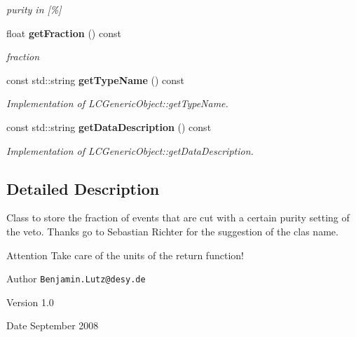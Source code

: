 \begin{DoxyCompactItemize}
\begin{DoxyCompactList}\small\item\em purity in [\%] \item\end{DoxyCompactList}\item 
float {\bf getFraction} () const 
\begin{DoxyCompactList}\small\item\em fraction \item\end{DoxyCompactList}\item 
const std::string {\bf getTypeName} () const \label{classCALICE_1_1VetoFraction_a1543156db25771800dc2b5af338f303a}

\begin{DoxyCompactList}\small\item\em Implementation of LCGenericObject::getTypeName. \item\end{DoxyCompactList}\item 
const std::string {\bf getDataDescription} () const \label{classCALICE_1_1VetoFraction_a25fa02f063a97ad451ef86eb3ca6fedc}

\begin{DoxyCompactList}\small\item\em Implementation of LCGenericObject::getDataDescription. \item\end{DoxyCompactList}\end{DoxyCompactItemize}


\subsection{Detailed Description}
Class to store the fraction of events that are cut with a certain purity setting of the veto. Thanks go to Sebastian Richter for the suggestion of the clas name.

\begin{DoxyAttention}{Attention}
Take care of the units of the return function!
\end{DoxyAttention}
\begin{DoxyAuthor}{Author}
{\tt Benjamin.Lutz@desy.de} 
\end{DoxyAuthor}
\begin{DoxyVersion}{Version}
1.0 
\end{DoxyVersion}
\begin{DoxyDate}{Date}
September 2008 
\end{DoxyDate}



